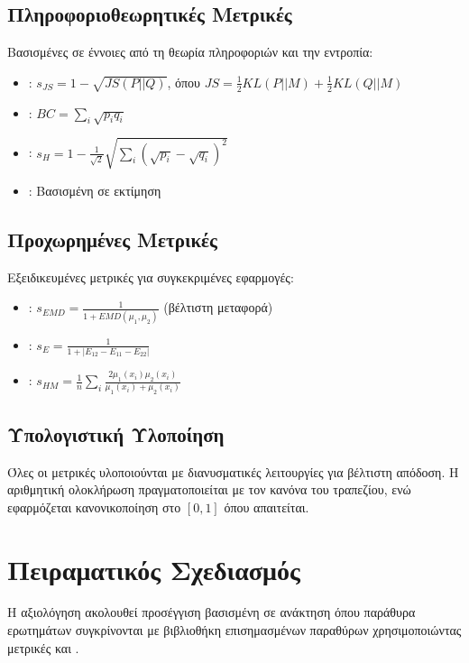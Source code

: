 \subsection{Πληροφοριοθεωρητικές Μετρικές}
Βασισμένες σε έννοιες από τη θεωρία πληροφοριών και την εντροπία:

\begin{itemize}
    \item \textbf{}: $s_{JS} = 1 - \sqrt{JS(P||Q)}$, όπου $JS = \frac{1}{2}KL(P||M) + \frac{1}{2}KL(Q||M)$
    \item \textbf{}: $BC = \sum_i \sqrt{p_i q_i}$
    \item \textbf{}: $s_H = 1 - \frac{1}{\sqrt{2}}\sqrt{\sum_i (\sqrt{p_i} - \sqrt{q_i})^2}$
    \item \textbf{}: Βασισμένη σε εκτίμηση 
\end{itemize}

\subsection{Προχωρημένες Μετρικές}
Εξειδικευμένες μετρικές για συγκεκριμένες εφαρμογές:

\begin{itemize}
    \item \textbf{}: $s_{EMD} = \frac{1}{1 + EMD(\mu_1, \mu_2)}$ (βέλτιστη μεταφορά)
    \item \textbf{}: $s_E = \frac{1}{1 + |E_{12} - E_{11} - E_{22}|}$ 
    \item \textbf{}: $s_{HM} = \frac{1}{n}\sum_i \frac{2\mu_1(x_i)\mu_2(x_i)}{\mu_1(x_i) + \mu_2(x_i)}$
\end{itemize}

\subsection{Υπολογιστική Υλοποίηση}
Όλες οι μετρικές υλοποιούνται με διανυσματικές λειτουργίες  για βέλτιστη απόδοση. Η αριθμητική ολοκλήρωση πραγματοποιείται με τον κανόνα του τραπεζίου, ενώ εφαρμόζεται κανονικοποίηση στο $[0,1]$ όπου απαιτείται.


\section{Πειραματικός Σχεδιασμός}
Η αξιολόγηση ακολουθεί προσέγγιση βασισμένη σε ανάκτηση όπου παράθυρα ερωτημάτων συγκρίνονται με βιβλιοθήκη επισημασμένων παραθύρων χρησιμοποιώντας μετρικές  και .

